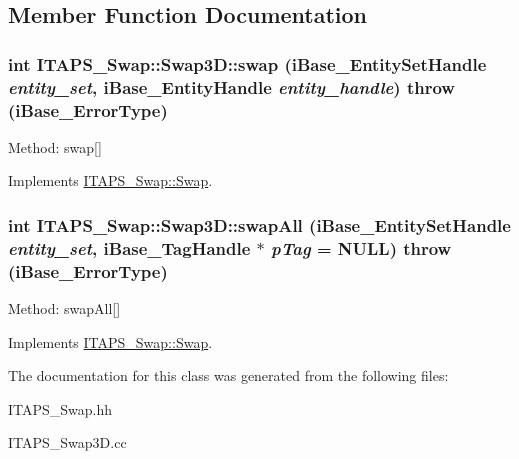 \subsection{Member Function Documentation}
\hypertarget{class_i_t_a_p_s___swap_1_1_swap3_d_a82a135da16b4ef6e5ff36f8293cc450c}{
\subsubsection[{swap}]{\setlength{\rightskip}{0pt plus 5cm}int ITAPS\_\-Swap::Swap3D::swap (iBase\_\-EntitySetHandle {\em entity\_\-set}, \/  iBase\_\-EntityHandle {\em entity\_\-handle})  throw (iBase\_\-ErrorType)}}
\label{class_i_t_a_p_s___swap_1_1_swap3_d_a82a135da16b4ef6e5ff36f8293cc450c}
Method: swap\mbox{[}\mbox{]} 

Implements \hyperlink{class_i_t_a_p_s___swap_1_1_swap_adfb444f7ade3254ba8fa9ced2ec15e65}{ITAPS\_\-Swap::Swap}.

\hypertarget{class_i_t_a_p_s___swap_1_1_swap3_d_a139a400102ad7039fcc74d92d72dea27}{
\subsubsection[{swapAll}]{\setlength{\rightskip}{0pt plus 5cm}int ITAPS\_\-Swap::Swap3D::swapAll (iBase\_\-EntitySetHandle {\em entity\_\-set}, \/  iBase\_\-TagHandle $\ast$ {\em pTag} = {\ttfamily NULL})  throw (iBase\_\-ErrorType)}}
\label{class_i_t_a_p_s___swap_1_1_swap3_d_a139a400102ad7039fcc74d92d72dea27}
Method: swapAll\mbox{[}\mbox{]} 

Implements \hyperlink{class_i_t_a_p_s___swap_1_1_swap_a8a1fdc1a12fb71dfe28881b10277eafc}{ITAPS\_\-Swap::Swap}.



The documentation for this class was generated from the following files:\begin{DoxyCompactItemize}
\item 
ITAPS\_\-Swap.hh\item 
ITAPS\_\-Swap3D.cc\end{DoxyCompactItemize}
